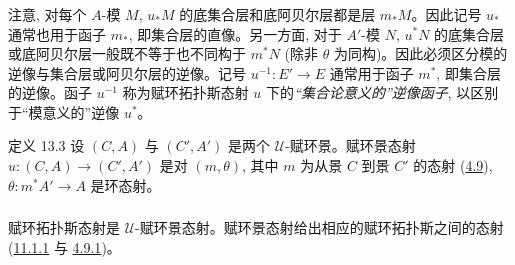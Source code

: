 \subsubsection{}
注意, 对每个 $A$-模 $M$, $u_{\ast}M$ 的底集合层和底阿贝尔层都是层 $m_{\ast}M$。因此记号 $u_{\ast}$ 通常也用于函子 $m_{\ast}$, 即集合层的直像。另一方面, 对于 $A'$-模 $N$, $u^{\ast}N$ 的底集合层或底阿贝尔层一般既不等于也不同构于 $m^{\ast}N$ (除非 $\theta$ 为同构)。因此必须区分模的逆像与集合层或阿贝尔层的逆像。记号 $u^{-1}:E'\rightarrow E$ 通常用于函子 $m^{\ast}$, 即集合层的逆像。函子 $u^{-1}$ 称为赋环拓扑斯态射 $u$ 下的\emph{“集合论意义的”逆像函子}, 以区别于“模意义的”逆像 $u^{\ast}$。

\begin{enonce*}{定义 13.3}
设 $(C,A)$ 与 $(C',A')$ 是两个 $𝒰$-赋环景。赋环景态射 $u:(C,A)\rightarrow(C',A')$ 是对 $(m,\theta)$, 其中 $m$ 为从景 $C$ 到景 $C'$ 的态射 (\hyperref[IV.subsec4.9]{4.9}), $\theta:m^{\ast}A'\rightarrow A$ 是\pageoriginale 环态射。
\end{enonce*}

\setcounter{subsection}{3} \setcounter{subsubsection}{0}
\subsubsection{}
赋环拓扑斯态射是 $𝒰$-赋环景态射。赋环景态射给出相应的赋环拓扑斯之间的态射 (\hyperref[IV.subsubsec11.1.1]{11.1.1} 与 \hyperref[IV.subsubsec4.9.1]{4.9.1})。

